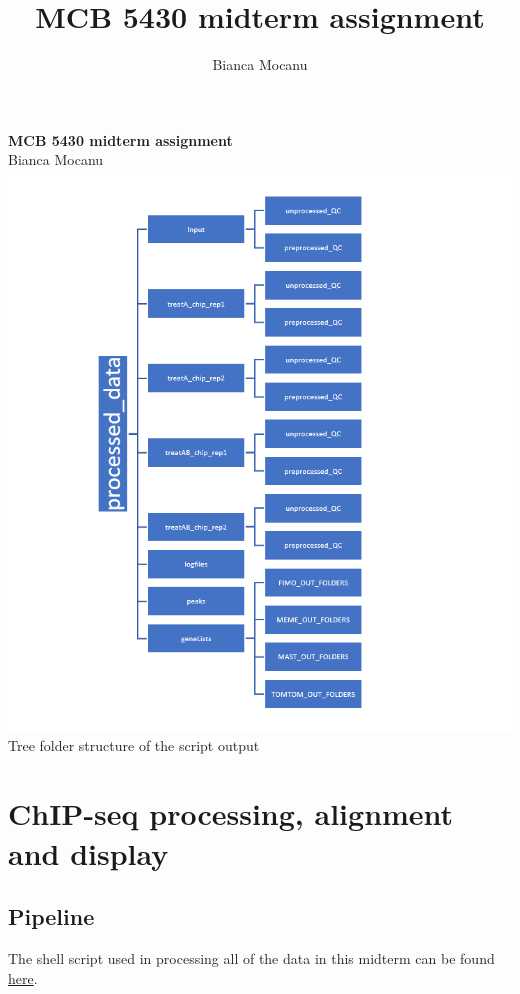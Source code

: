 \documentclass[a4paper,11pt]{article}
\title{MCB 5430 midterm assignment}
\author{Bianca Mocanu}
\begin{document}
\begin{titlepage}

\begin{center}
\noindent \Large{\textbf{MCB 5430 midterm assignment}}\\
\vspace{0.7cm}
\small{Bianca Mocanu}\\

\includegraphics[scale=1]{folder_tree.PNG}
\noindent \footnotesize Tree folder structure of the script output
\end{center}
\end{titlepage}

\section{ChIP-seq processing, alignment and display}
\subsection{Pipeline}
\normalsize The shell script used in processing all of the data in this midterm can be found \color{blue}\href{https://github.com/biancamocanu/MCB5430_midterm/blob/master/pipe.sh}{here}. \color{black}
\end{document}
